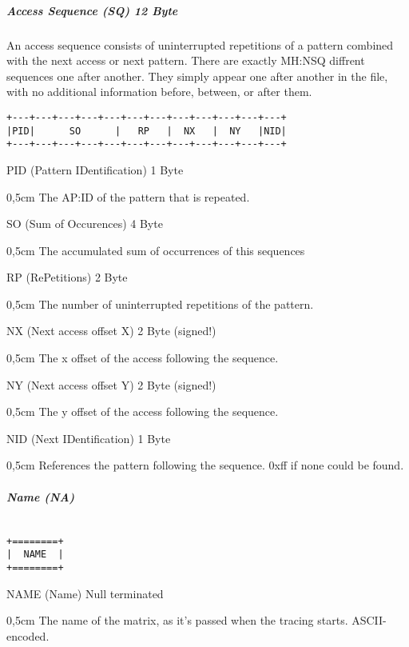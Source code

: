 \subparagraph{Access Sequence (SQ) 12 Byte}$\;$ \\

An access sequence consists of uninterrupted repetitions of a pattern combined with the next access or next 
pattern. There are exactly MH:NSQ diffrent sequences one after another. They simply appear one after another 
in the file, with no additional information before, between, or after them.
\begin{verbatim}
+---+---+---+---+---+---+---+---+---+---+---+---+
|PID|      SO      |   RP   |  NX   |  NY   |NID|
+---+---+---+---+---+---+---+---+---+---+---+---+
\end{verbatim}
PID (Pattern IDentification) 1 Byte
\begin{addmargin}[0,5cm]{0,5cm} 
	The AP:ID of the pattern that is repeated.
\end{addmargin}
SO (Sum of Occurences) 4 Byte
\begin{addmargin}[0,5cm]{0,5cm} 
	The accumulated sum of occurrences of this sequences
\end{addmargin}
RP (RePetitions) 2 Byte
\begin{addmargin}[0,5cm]{0,5cm} 
	The number of uninterrupted repetitions of the pattern.
\end{addmargin}
NX (Next access offset X) 2 Byte (signed!)
\begin{addmargin}[0,5cm]{0,5cm} 
	The x offset of the access following the sequence.
\end{addmargin}
NY (Next access offset Y) 2 Byte (signed!)
\begin{addmargin}[0,5cm]{0,5cm} 
	The y offset of the access following the sequence.
\end{addmargin}
NID (Next IDentification) 1 Byte
\begin{addmargin}[0,5cm]{0,5cm} 
	References the pattern following the sequence. 0xff if none could be found.
\end{addmargin}

\subparagraph{Name (NA)}$\;$ \\
\begin{verbatim}
+========+
|  NAME  |
+========+
\end{verbatim}
NAME (Name) Null terminated
\begin{addmargin}[0,5cm]{0,5cm} 
	The name of the matrix, as it's passed when the tracing starts. ASCII-encoded.
\end{addmargin}
